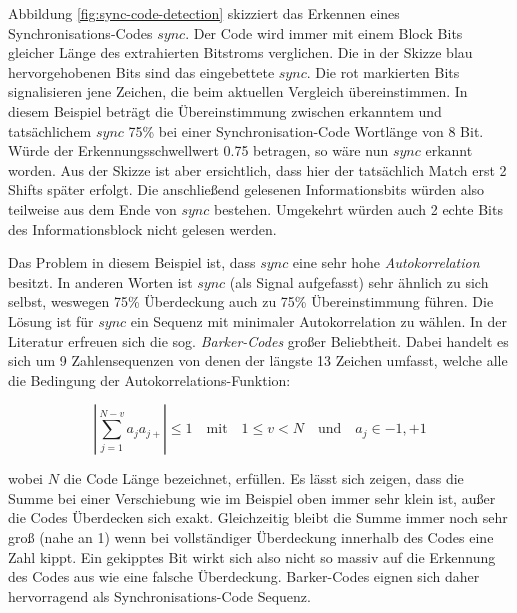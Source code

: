 Abbildung \ref{fig:sync-code-detection} skizziert das Erkennen eines Synchronisations-Codes $sync$. Der Code wird immer mit einem Block Bits gleicher \mbox{Länge} des extrahierten Bitstroms verglichen. Die in der Skizze blau hervorgehobenen Bits sind das ein\-gebettete $sync$. Die rot markierten Bits signal\-isieren jene Zeichen, die beim \mbox{aktuellen} Vergleich über\-einstimmen. In diesem Beispiel beträgt die Über\-einstimmung zwischen er\-kanntem und tatsächlichem $sync$ 75\% bei einer Synchronisation-Code Wortlänge von 8 Bit. Würde der Erkennungsschwellwert 0.75 betragen, so wäre nun $sync$ erkannt worden. Aus der Skizze ist aber ersichtlich, dass hier der tatsächlich Match erst 2 Shifts später erfolgt. Die anschließend gelesenen Informationsbits würden also teilweise aus dem Ende von $sync$ bestehen. Umgekehrt würden auch 2 echte Bits des Informationsblock nicht gelesen werden.

Das Problem in diesem Beispiel ist, dass $sync$ eine sehr hohe \textit{Autokorrelation} besitzt. In anderen Worten ist $sync$ (als Signal aufgefasst) sehr ähnlich zu sich selbst, weswegen 75\% Überdeckung auch zu 75\% Übereinstimmung führen. Die Lösung ist für $sync$ ein Sequenz mit minimaler Autokorrelation zu wählen. In der Literatur\cite{huang2002blind}\cite{lie2006robust}\cite{chang2012location} erfreuen sich die sog. \textit{Barker-Codes}\cite{barker1953group} großer Beliebtheit. Dabei handelt es sich um 9 Zahlensequenzen von denen der längste 13 Zeichen umfasst, welche alle die Bedingung der Autokorrelations-Funktion:

	 \begin{equation}
		 | \sum\limits_{j=1}^{N-v} a_j {a}_{j+} | \leq 1 \quad\mbox{mit}\quad 1 \leq v < N \quad\mbox{und}\quad a_j \in {-1,+1}
	 	\label{equ:barker-correlation}
	 \end{equation}

wobei $N$ die Code Länge bezeichnet, erfüllen. Es lässt sich zeigen, dass die Summe bei einer Verschiebung wie im Beispiel oben immer sehr klein ist, außer die Codes Überdecken sich exakt. Gleichzeitig bleibt die Summe immer noch sehr groß (nahe an 1) wenn bei vollständiger Überdeckung innerhalb des Codes eine Zahl kippt. Ein gekipptes Bit wirkt sich also nicht so massiv auf die Erkennung des Codes aus wie eine falsche Überdeckung. Barker-Codes eignen sich daher hervorragend als Synchronisations-Code Sequenz. 

